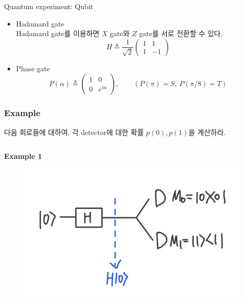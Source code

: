 \documentclass[9pt]{beamer}
\begin{document}
\begin{section}{Quantum experiment: Qubit}
\begin{frame}
\begin{itemize}
                    \item Hadamard gate
                    \vspace{0.05cm}
                    \\ Hadamard gate를 이용하면 $X$ gate와 $Z$ gate를 서로 전환할 수 있다. 
                    $$
                    H \triangleq \frac{1}{\sqrt 2} \left(\begin{array}{cc}
                    1 & 1 \\
                    1 & -1
                    \end{array}\right) 
                    $$ 
                    \item Phase gate
                    $$
                    P(\alpha) \triangleq  \left(\begin{array}{cc}
                    1 & 0 \\
                    0 & e^{i \alpha}
                    \end{array}\right),\qquad (P(\pi) = S,\ P(\pi/8) = T)
                    $$
                \end{itemize}
        \end{frame}

        \begin{frame}
            \frametitle{Example}
            다음 회로들에 대하여, 각 detector에 대한 확률 $p(0), p(1)$을 계산하라. 
            \vspace{0.5cm}
            \begin{columns}
                \begin{column}{0.4\textwidth}
                    \textbf{Example 1}
                    \begin{figure}
                        \includegraphics[width=0.8\columnwidth]{image/L1_ex1.png}
                    \end{figure}

                \end{column}


\end{columns}
\end{frame}
\end{section}
\end{document}
